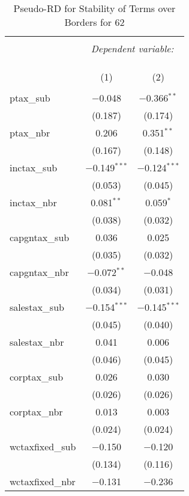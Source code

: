 
\begin{table}[!htbp] \centering 
  \caption{Pseudo-RD for Stability of Terms over Borders for  62} 
  \label{} 
\begin{tabular}{@{\extracolsep{5pt}}lcc} 
\\[-1.8ex]\hline 
\hline \\[-1.8ex] 
 & \multicolumn{2}{c}{\textit{Dependent variable:}} \\ 
\cline{2-3} 
\\[-1.8ex] & \multicolumn{2}{c}{ } \\ 
\\[-1.8ex] & (1) & (2)\\ 
\hline \\[-1.8ex] 
 ptax\_sub & $-$0.048 & $-$0.366$^{**}$ \\ 
  & (0.187) & (0.174) \\ 
  ptax\_nbr & 0.206 & 0.351$^{**}$ \\ 
  & (0.167) & (0.148) \\ 
  inctax\_sub & $-$0.149$^{***}$ & $-$0.124$^{***}$ \\ 
  & (0.053) & (0.045) \\ 
  inctax\_nbr & 0.081$^{**}$ & 0.059$^{*}$ \\ 
  & (0.038) & (0.032) \\ 
  capgntax\_sub & 0.036 & 0.025 \\ 
  & (0.035) & (0.032) \\ 
  capgntax\_nbr & $-$0.072$^{**}$ & $-$0.048 \\ 
  & (0.034) & (0.031) \\ 
  salestax\_sub & $-$0.154$^{***}$ & $-$0.145$^{***}$ \\ 
  & (0.045) & (0.040) \\ 
  salestax\_nbr & 0.041 & 0.006 \\ 
  & (0.046) & (0.045) \\ 
  corptax\_sub & 0.026 & 0.030 \\ 
  & (0.026) & (0.026) \\ 
  corptax\_nbr & 0.013 & 0.003 \\ 
  & (0.024) & (0.024) \\ 
  wctaxfixed\_sub & $-$0.150 & $-$0.120 \\ 
  & (0.134) & (0.116) \\ 
  wctaxfixed\_nbr & $-$0.131 & $-$0.236 \\ 

\end{tabular}
\end{table}
